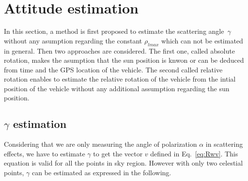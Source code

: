 \graphicspath{{./content/intro/figures/}}

\section{Attitude estimation}
\label{sec:g-abs-rel}
In this section, a method is first proposed to estimate the scattering angle~$\gamma$
without any asumption regarding the constant $\rho_{lmax}$ which can not be estimated in general.
Then two approaches are considered. The first one, called absolute rotation, makes the asumption
that the sun position is knwon or can be deduced from time and the GPS location of the vehicle. The second
called relative rotation enables to estimate the relative rotation of the vehicle from the intial position of the vehicle without any additional assumption regarding the sun position.


\subsection{$\gamma$ estimation}
\label{sec:gamma}
Considering that we are only measuring the angle of polarization $\alpha$
in scattering effects, we have to estimate $\gamma$ to get the vector
$v$ defined in Eq.~\ref{eq:Rwv}. This equation is valid for all the points in
sky region. However with only two celestial points, $\gamma$ can be estimated as
expressed in the following.

